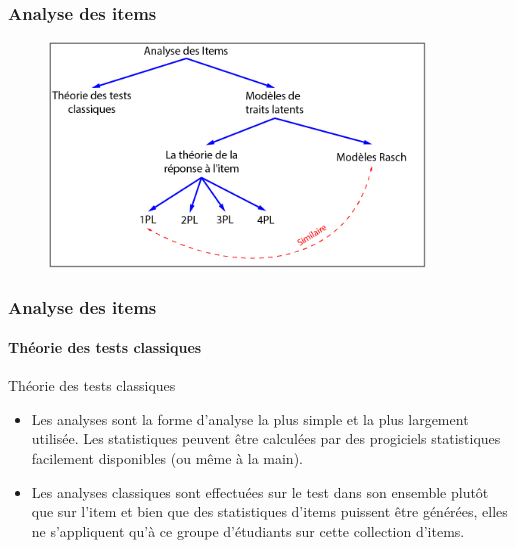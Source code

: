 \documentclass[aspectratio=169,professionalfonts, 12pt]{beamer}
\begin{document}
\begin{frame}
  \frametitle{Analyse des items}
  \justifying 
  \begin{minipage}{\textwidth}
  \begin{figure}[H]
      \includegraphics[height=6cm]{images/etat_art/items_analysis.png}
  \end{figure}
  \end{minipage}
\end{frame}


\begin{frame}
  \frametitle{Analyse des items}
  \framesubtitle{Théorie des tests classiques}
  \justifying 
  \begin{minipage}{\textwidth}
  \begin{block}{Théorie des tests classiques}
    \begin{itemize}
      \item	Les analyses sont la forme d'analyse la plus simple et la plus largement utilisée. Les statistiques peuvent être calculées par des progiciels statistiques facilement disponibles (ou même à la main).
      \item	Les analyses classiques sont effectuées sur le test dans son ensemble plutôt que sur l'item et bien que des statistiques d'items puissent être générées, elles ne s'appliquent qu'à ce groupe d'étudiants sur cette collection d'items. 
    \end{itemize}
  \end{block}  
  \end{minipage} 
\end{frame}
\end{document}
